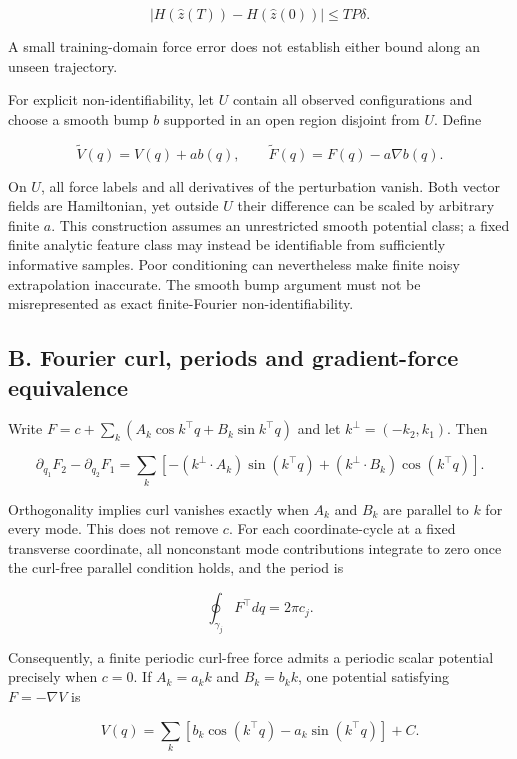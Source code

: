 \documentclass[
  10pt,
]{article}
\begin{document}
\[|H(\widehat z(T))-H(\widehat z(0))|\le TP\delta.\]

A small training-domain force error does not establish either bound
along an unseen trajectory.

For explicit non-identifiability, let \(U\) contain all observed
configurations and choose a smooth bump \(b\) supported in an open
region disjoint from \(U\). Define

\[\widetilde V(q)=V(q)+a b(q),\qquad \widetilde F(q)=F(q)-a\nabla b(q).\]

On \(U\), all force labels and all derivatives of the perturbation
vanish. Both vector fields are Hamiltonian, yet outside \(U\) their
difference can be scaled by arbitrary finite \(a\). This construction
assumes an unrestricted smooth potential class; a fixed finite analytic
feature class may instead be identifiable from sufficiently informative
samples. Poor conditioning can nevertheless make finite noisy
extrapolation inaccurate. The smooth bump argument must not be
misrepresented as exact finite-Fourier non-identifiability.

\hypertarget{b.-fourier-curl-periods-and-gradient-force-equivalence}{%
\subsection*{B. Fourier curl, periods and gradient-force
equivalence}\label{b.-fourier-curl-periods-and-gradient-force-equivalence}}

Write \(F=c+\sum_k(A_k\cos k^\top q+B_k\sin k^\top q)\) and let
\(k^\perp=(-k_2,k_1)\). Then

\[\partial_{q_1}F_2-\partial_{q_2}F_1
=\sum_k[-(k^\perp\!\cdot A_k)\sin(k^\top q)+(k^\perp\!\cdot B_k)\cos(k^\top q)].\]

Orthogonality implies curl vanishes exactly when \(A_k\) and \(B_k\) are
parallel to \(k\) for every mode. This does not remove \(c\). For each
coordinate-cycle at a fixed transverse coordinate, all nonconstant mode
contributions integrate to zero once the curl-free parallel condition
holds, and the period is

\[\oint_{\gamma_j}F^\top dq=2\pi c_j.\]

Consequently, a finite periodic curl-free force admits a periodic scalar
potential precisely when \(c=0\). If \(A_k=a_k k\) and \(B_k=b_k k\),
one potential satisfying \(F=-\nabla V\) is

\[V(q)=\sum_k[b_k\cos(k^\top q)-a_k\sin(k^\top q)]+C.\]
\end{document}
